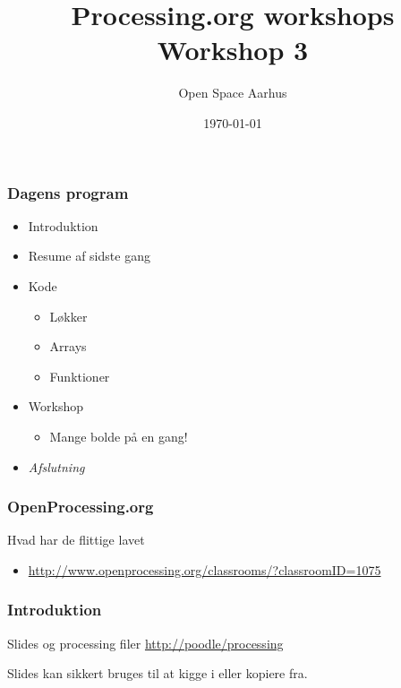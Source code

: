 \documentclass{beamer}
\title{Processing.org workshops\\Workshop 3}
\author{Open Space Aarhus}
\date{\today}
\institute[Bryggervej 30]{Bryggervej 30, 8240 Århus N}
\begin{document}
\begin{frame}[label=titlepage]
  \titlepage
\end{frame}

\begin{frame}
  \frametitle{Dagens program}
  \begin{itemize}
  \item Introduktion
  \item Resume af sidste gang
  \item Kode
    \begin{itemize}
    \item Løkker
    \item Arrays
    \item Funktioner
    \end{itemize}

  \item Workshop
    \begin{itemize}
    \item Mange bolde på en gang!
    \end{itemize}

  \item \emph{Afslutning}
    
  \end{itemize}						
\end{frame}


\begin{frame}
  \frametitle{OpenProcessing.org}
  \begin{block}{Hvad har de flittige lavet}
    \begin{itemize}
    \item \url{http://www.openprocessing.org/classrooms/?classroomID=1075}
    \end{itemize}
  \end{block}
\end{frame}


\begin{frame}
  \frametitle{Introduktion}
  
  \begin{block}{Slides og processing filer}
    \url{http://poodle/processing}   
  \end{block}
  {\tiny Slides kan sikkert bruges til at kigge i eller kopiere fra.}
\end{frame}
\end{document}
